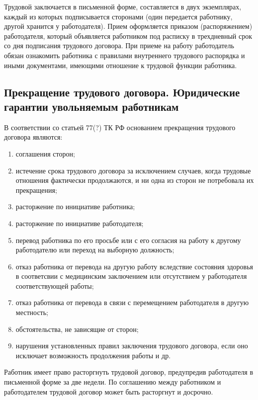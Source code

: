 Трудовой заключается в письменной форме, составляется в двух экземплярах, каждый из которых подписывается сторонами (один передается работнику, другой хранится у работодателя). Прием оформляется приказом (распоряжением) работодателя, который объявляется работником под расписку в трехдневный срок со дня подписания трудового договора. При приеме на работу работодатель обязан ознакомить работника с правилами внутреннего трудового распорядка и иными документами, имеющими отношение к трудовой функции работника. 

\subsection{Прекращение трудового договора. Юридические гарантии увольняемым работникам}

В соответствии со статьей 77(?) ТК РФ основанием прекращения трудового договора являются:

\begin{enumerate}
	\item соглашения сторон;
	\item истечение срока трудового договора за исключением случаев, когда трудовые отношения фактически продолжаются, и ни одна из сторон не потребовала их прекращения;
	\item расторжение по инициативе работника;
	\item расторжение по инициативе работодателя;
	\item перевод работника по его просьбе или с его согласия на работу к другому работодателю или переход на выборную должность;
	\item отказ работника от перевода на другую работу вследствие состояния здоровья в соответсвии с медицинским заключением или отсутствием у работодателя соответствующей работы;
	\item отказ работника от перевода в связи с перемещением работодателя в другую местность;
	\item обстоятельства, не зависящие от сторон;
	\item нарушения установленных правил заключения трудового договора, если оно исключает возможность продолжения работы и др.
\end{enumerate}

Работник имеет право расторгнуть трудовой договор, предупредив работодателя в письменной форме за две недели. По соглашению между работником и работодателем трудовой договор может быть расторгнут и досрочно.

